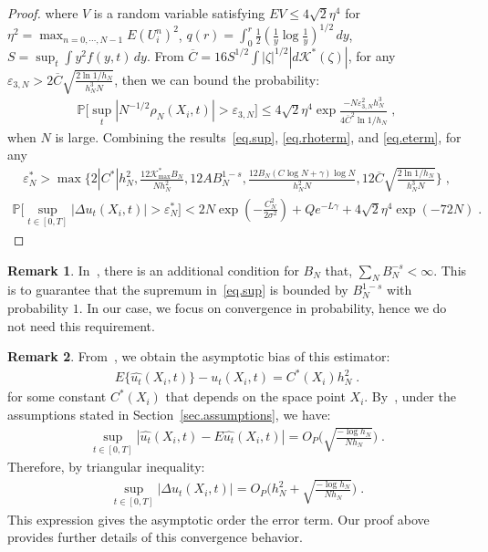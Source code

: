 \documentclass[a4paper,11pt]{article}
\theoremstyle{definition}
\newtheorem{remark}{Remark}[section]
\begin{document}
\begin{proof}
where  $V$ is a random variable satisfying $EV\leq 4\sqrt{2}\eta^4$ for $\eta^2 = \max_{n=0,\cdots,N-1}E(U_i^n)^2$, $q(r)=\int_0^r\frac{1}{2}(\frac{1}{y}\log\frac{1}{y})^{1/2}\,dy$, $S=\sup_t\int y^2f(y,t)\,dy$.  From $\overline{C}=16S^{1/2}\int|\zeta|^{1/2}|d\mathcal{K}^*(\zeta)|$,  for any $\varepsilon_{3,N}>2\overline{C}\sqrt{\frac{2\ln1/h_N}{h_N^3N}}$, then we can bound the probability:
\begin{align*}
\mathbb{P}\Big[\sup_t|N^{-1/2}\rho_N(X_i,t)|>\varepsilon_{3,N}\Big]\leq 4\sqrt{2}\eta^4\exp\frac{-N\varepsilon_{3,N}^2h_N^3}{4\overline{C}^2\ln 1/h_N}\;,
\end{align*}
when $N$ is large. Combining the results~\eqref{eq.sup}, \eqref{eq.rhoterm}, and \eqref{eq.eterm}, for any
\begin{align*}
\varepsilon_N^*>\max\{2|C^*|h_N^2,\frac{12\mathcal{K}^*_{\max}B_N}{Nh_N^2},12AB_N^{1-s},\frac{12B_N(C\log N+\gamma)\log N}{h_N^2N},12\overline{C}\sqrt{\frac{2\ln1/h_N}{h_N^3N}}\}	\;,
\end{align*}
\begin{align*}
\mathbb{P}\Big[\sup_{t\in[0,T]}|\Delta u_t(X_i,t)|>\varepsilon_N^*\Big]<2N \exp(-\frac{C_N^2}{2\sigma^2})+Qe^{-L\gamma}+4\sqrt{2}\eta^4\exp(-72N)\;.
\end{align*}
\end{proof}
\begin{remark}
In~\cite{mack1982weak}, there is an additional condition for $B_N$ that, $\sum_{N}B_N^{-s}<\infty$. This is to guarantee that the supremum in~\eqref{eq.sup} is bounded by $B_N^{1-s}$ with probability $1$. In our case, we focus on convergence in probability, hence we do not need this requirement.
\end{remark}
\begin{remark}
From~\cite{fan1997local}, we obtain the asymptotic bias of this estimator:
\begin{align*}
	E\{\widehat{u_t}(X_i,t)\}- u_t(X_i,t)=C^*(X_i)h_N^{2}\;.
\end{align*}
for some constant $C^*(X_i)$ that depends on the space point $X_i$. By~\cite{tusnady1977remark,mack1982weak}, under the assumptions stated in Section~\ref{sec.assumptions}, we have:
\begin{align*}
\sup_{t\in[0,T]}|\widehat{u_t}(X_i,t)-E\widehat{u_t}(X_i,t)|	=O_P\Big(\sqrt{\frac{-\log h_N}{Nh_N}}\Big)\;.
\end{align*}
Therefore, by triangular inequality:
\begin{align*}
\sup_{t\in[0,T]}|\Delta u_t(X_i,t)|=	O_P\Big(h_N^2+\sqrt{\frac{-\log h_N}{Nh_N}}\Big)\;.
\end{align*}
This expression gives the asymptotic order the error term. Our proof above provides further details of this convergence behavior.
\end{remark}
\end{document}
